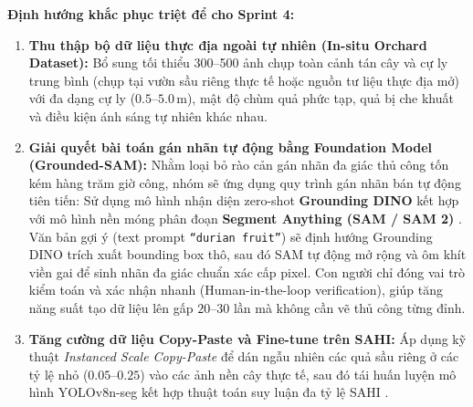 \documentclass[12pt,a4paper]{article}
\begin{document}
\noindent\textbf{Định hướng khắc phục triệt để cho Sprint 4:}
\begin{enumerate}
    \item \textbf{Thu thập bộ dữ liệu thực địa ngoài tự nhiên (In-situ Orchard Dataset):} Bổ sung tối thiểu 300--500 ảnh chụp toàn cảnh tán cây và cự ly trung bình (chụp tại vườn sầu riêng thực tế hoặc nguồn tư liệu thực địa mở) với đa dạng cự ly ($0.5\text{--}5.0\,\text{m}$), mật độ chùm quả phức tạp, quả bị che khuất và điều kiện ánh sáng tự nhiên khác nhau.
    \item \textbf{Giải quyết bài toán gán nhãn tự động bằng Foundation Model (Grounded-SAM):} Nhằm loại bỏ rào cản gán nhãn đa giác thủ công tốn kém hàng trăm giờ công, nhóm sẽ ứng dụng quy trình gán nhãn bán tự động tiên tiến: Sử dụng mô hình nhận diện zero-shot \textbf{Grounding DINO} \cite{liu2023grounding} kết hợp với mô hình nền móng phân đoạn \textbf{Segment Anything (SAM / SAM 2)} \cite{kirillov2023segment}. Văn bản gợi ý (text prompt \texttt{``durian fruit''}) sẽ định hướng Grounding DINO trích xuất bounding box thô, sau đó SAM tự động mở rộng và ôm khít viền gai để sinh nhãn đa giác chuẩn xác cấp pixel. Con người chỉ đóng vai trò kiểm toán và xác nhận nhanh (Human-in-the-loop verification), giúp tăng năng suất tạo dữ liệu lên gấp $20\text{--}30$ lần mà không cần vẽ thủ công từng đỉnh.
    \item \textbf{Tăng cường dữ liệu Copy-Paste và Fine-tune trên SAHI:} Áp dụng kỹ thuật \textit{Instanced Scale Copy-Paste} để dán ngẫu nhiên các quả sầu riêng ở các tỷ lệ nhỏ ($0.05\text{--}0.25$) vào các ảnh nền cây thực tế, sau đó tái huấn luyện mô hình YOLOv8n-seg kết hợp thuật toán suy luận đa tỷ lệ SAHI \cite{akyon2022sahi}.
\end{enumerate}
\end{document}
